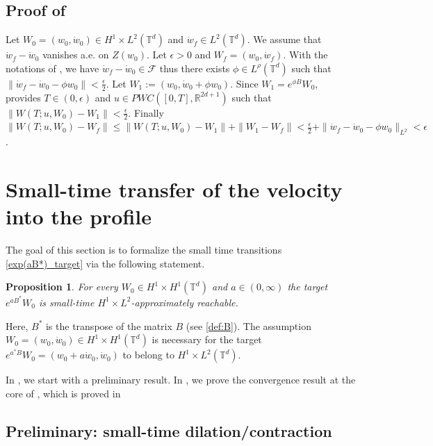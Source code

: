 \documentclass[a4paper]{article}
\theoremstyle{plain}
\newtheorem{proposition}[theorem]{Proposition}
\newcommand{\T}{\mathbb{T}}
\newcommand{\R}{\mathbb{R}}
\begin{document}
\subsection{Proof of }
\label{subsec:Proof_Vel}


Let $W_0=(w_0,\dot{w}_0)\in H^1 \times  L^2(\T^d)$ and $\dot{w}_f \in L^2(\T^d)$. We assume that $\dot{w}_f-\dot{w}_0$ vanishes a.e. on $Z(w_0)$. Let $\epsilon>0$ and $W_f=(w_0,\dot{w}_f)$.
With the notations of , we have $\dot{w}_f-\dot{w}_{0}  \in \mathcal{F}$ thus there exists $\phi \in L^{\rho}(\T^d)$ such that $\|\dot{w}_f-\dot{w}_0-\phi w_0\|<\frac{\epsilon}{2}$. Let $W_1:=(w_0,\dot{w}_0+\phi w_0)$. Since $W_1=e^{\phi B}W_0$,  provides $T \in (0,\epsilon)$ and $u \in PWC([0,T],\R^{2d+1})$ such that $\|W(T;u,W_0)-W_1\|<\frac{\epsilon}{2}$. Finally 
$\|W(T;u,W_0)-W_f\| \leq \|W(T;u,W_0)-W_1\| + \| W_1-W_f \| < \frac{\epsilon}{2} + \|\dot{w}_f-\dot{w}_0-\phi w_0\|_{L^2} <  \epsilon$.



\section{Small-time transfer of the velocity into the profile} \label{sec:vel->prof}

The goal of this section is to formalize the small time transitions \eqref{exp(aB*)_target} via the following statement.

\begin{proposition} \label{Prop:STAR_fin}
For every $W_0 \in H^1 \times H^1(\T^d)$ and $a \in (0,\infty)$ the target $e^{aB^*}W_0$ is small-time $H^1\times L^2$-approximately reachable.
\end{proposition}

Here, $B^*$ is the transpose of the matrix $B$ (see \eqref{def:B}).
The assumption $W_0=(w_0,\dot{w}_0) \in H^1 \times H^1(\T^d)$ is necessary for the target
$e^{a^* B} W_0 =(w_0+a\dot{w}_0,\dot{w}_0)$ to belong to $H^1 \times L^2(\T^d)$. 

In , we start with a preliminary result. In , we prove the convergence result at the core of , which is proved in 


\subsection{Preliminary: small-time dilation/contraction}\label{subsec:dil}
\end{document}
